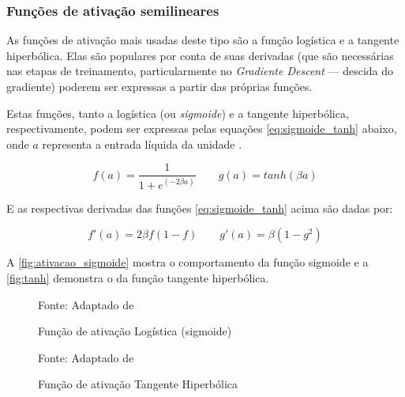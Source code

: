 \subsubsection{Funções de ativação semilineares}\label{ativacao_semilinear}
As funções de ativação mais usadas deste tipo são a função logística e a tangente hiperbólica. Elas são populares por conta de suas derivadas (que são necessárias nas etapas de treinamento, particularmente no \textit{Gradiente Descent} --- descida do gradiente) poderem ser expressas a partir das próprias funções.

Estas funções, tanto a logística (ou \textit{sigmoide}) e a tangente hiperbólica, respectivamente, podem ser expressas pelas equações \ref{eq:sigmoide_tanh} abaixo, onde $a$ representa a entrada líquida da unidade \cite{haykin_redes_2001, lima_ia_2016}.

\begin{equation}\label{eq:sigmoide_tanh}
	f(a) = \frac{1}{1+ e^{(-2 \beta a)}} \qquad g(a) = tanh(\beta a)
\end{equation}

E as respectivas derivadas das funções \ref{eq:sigmoide_tanh} acima são dadas por:

\begin{equation}\label{derivadas_sigmoide_tanh}
	f'(a) = 2 \beta f(1-f) \qquad g'(a) = \beta (1-g^2)
\end{equation}

A \autoref{fig:ativacao_sigmoide} mostra o comportamento da função sigmoide e a \autoref{fig:tanh} demonstra o da função tangente hiperbólica.

\begin{figure}[h!]
	\centering
	\caption{Função de ativação Logística (sigmoide)}
	
	{\scriptsize 	Fonte: Adaptado de }
	\label{fig:ativacao_sigmoide}
\end{figure}

\begin{figure}[h!]
	\centering
	\caption{Função de ativação Tangente Hiperbólica}
	
	{\scriptsize 	Fonte: Adaptado de }
	\label{fig:tanh}
\end{figure}


